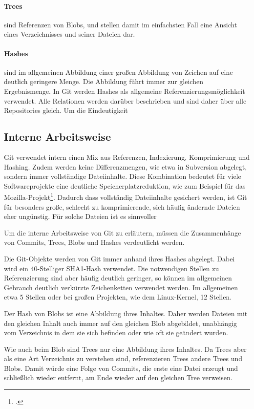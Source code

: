 \paragraph{Trees} sind Referenzen von Blobs, und stellen damit im einfachsten Fall eine Ansicht eines Verzeichnisses und seiner Dateien dar.

\paragraph{Hashes} sind im allgemeinen Abbildung einer großen Abbildung von Zeichen auf eine deutlich geringere Menge. Die Abbildung führt immer zur gleichen Ergebnismenge. In Git werden Hashes als allgemeine Referenzierungsmöglichkeit verwendet. Alle Relationen werden darüber beschrieben und sind daher über alle Repositories gleich. Um die Eindeutigkeit 

\subsection{Interne Arbeitsweise}

Git verwendet intern einen Mix aus Referenzen, Indexierung, Komprimierung und Hashing. Zudem werden keine Differenzmengen, wie etwa in Subversion abgelegt, sondern immer vollständige Dateiinhalte. Diese Kombination bedeutet für viele Softwareprojekte eine deutliche Speicherplatzreduktion, wie zum Beispiel für das Mozilla-Projekt\footcite{kernel-git-svn}. Dadurch dass vollständig Dateiinhalte gesichert werden, ist Git für besonders große, schlecht zu komprimierende, sich häufig ändernde Dateien eher ungünstig. Für solche Dateien ist es sinnvoller 

Um die interne Arbeitsweise von Git zu erläutern, müssen die Zusammenhänge von Commits, Trees, Blobs und Hashes verdeutlicht werden.

Die Git-Objekte werden von Git immer anhand ihres Hashes abgelegt. Dabei wird ein 40-Stelliger SHA1-Hash verwendet. Die notwendigen Stellen zu Referenzierung sind aber häufig deutlich geringer, so können im allgemeinen Gebrauch deutlich verkürzte Zeichenketten verwendet werden. Im allgemeinen etwa 5 Stellen oder bei großen Projekten, wie dem Linux-Kernel, 12 Stellen.

Der Hash von Blobs ist eine Abbildung ihres Inhaltes. Daher werden Dateien mit den gleichen Inhalt auch immer auf den gleichen Blob abgebildet, unabhängig vom Verzeichnis in dem sie sich befinden oder wie oft sie geändert wurden.

Wie auch beim Blob sind Trees nur eine Abbildung ihres Inhaltes. Da Trees aber als eine Art Verzeichnis zu verstehen sind, referenzieren Trees andere Trees und Blobs. Damit würde eine Folge von Commits, die erste eine Datei erzeugt und schließlich wieder entfernt, am Ende wieder auf den gleichen Tree verweisen.


